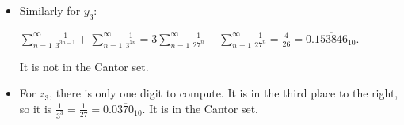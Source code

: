 \documentclass[12pt]{article}
\begin{document}
\begin{enumerate}[start = 1, label = {\bfseries Question \arabic*}, leftmargin=1in]
\begin{itemize}
\begin{center}
            $\sum\limits_{n=1}^{\infty}\frac{2}{3^{3n}}=2\sum\limits_{n=1}^{\infty}\frac{1}{{3^3}^n}=2\sum\limits_{n=1}^{\infty}\frac{1}{{27}^n}=\frac{1}{13}=0.\overline{0726923}_{10}$.
        \end{center} It is in the Cantor set.
        \item[(b)] Similarly for $y_3$:\begin{center}
            $\sum\limits_{n=1}^{\infty}\frac{1}{3^{3n-1}}+\sum\limits_{n=1}^{\infty}\frac{1}{3^{3n}}=3\sum\limits_{n=1}^{\infty}\frac{1}{27^n}+\sum\limits_{n=1}^{\infty}\frac{1}{27^n}=\frac{4}{26}=0.\overline{153846}_{10}$.
        \end{center} It is not in the Cantor set.
        \item[(c)] For $z_3$, there is only one digit to compute. It is in the third place to the right, so it is $\frac{1}{3^3}=\frac{1}{27}=0.0\overline{370}_{10}$. It is in the Cantor set.
    \end{itemize}
\end{enumerate}
\end{document}
